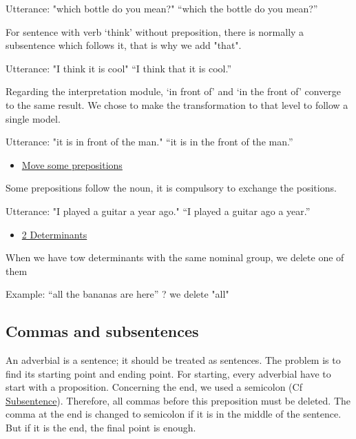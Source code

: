\documentclass[twoside,a4paper,10pt]{report}
\begin{document}
\small
\begin{verbatimtab}
  Utterance: "which bottle do you mean?"
  “which the bottle do you mean?”
\end{verbatimtab}
\normalsize
For sentence with verb ‘think’ without preposition, there is normally a subsentence which follows it, that is why we add "that".


\small
\begin{verbatimtab}
  Utterance: "I think it is cool"
  “I think that it is cool.”
\end{verbatimtab}
\normalsize
Regarding the interpretation module, ‘in front of’ and ‘in the front of’ converge to the same result. We chose to make the transformation to that level to follow a single model.


\small
\begin{verbatimtab}
  Utterance: "it is in front of the man."
  “it is in the front of the man.”
\end{verbatimtab}
\normalsize

\begin{itemize}
    \item  \underline{Move some prepositions}
\end{itemize}
Some prepositions follow the noun, it is compulsory to exchange the positions.


\small
\begin{verbatimtab}
  Utterance: "I played a guitar a year ago."
  “I played a guitar ago a year.”
\end{verbatimtab}
\normalsize

\begin{itemize}
    \item  \underline{2 Determinants}
\end{itemize}
When we have tow determinants with the same nominal group, we delete one of them


\small
\begin{verbatimtab}
  Example: “all the bananas are here” ? we delete "all"
\end{verbatimtab}
\normalsize

\subsection{Commas and subsentences}
\label{f50e61d6a41031b0a4d3b4c2287c8dfa}%
An adverbial is a sentence; it should be treated as sentences. The problem is to find its starting point and ending point. For starting, every adverbial have to start with a proposition. Concerning the end, we used a semicolon (Cf \hyperref[60550ca08c44dda94b3d7a018a352868]{Subsentence}). Therefore, all commas before this preposition must be deleted. The comma at the end is changed to semicolon if it is in the middle of the sentence. But if it is the end, the final point is enough.
\end{document}

